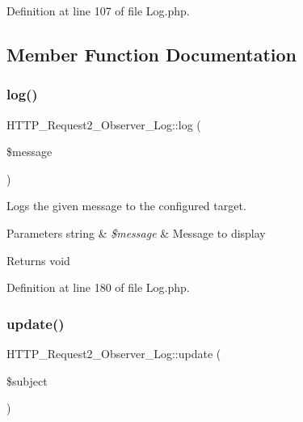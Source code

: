 Definition at line 107 of file Log.\+php.



\subsection{Member Function Documentation}
\mbox{\label{classHTTP__Request2__Observer__Log_a253f36793403dd77277fb2e76d19c117}} 
\subsubsection{\texorpdfstring{log()}{log()}}
{\footnotesize\ttfamily H\+T\+T\+P\+\_\+\+Request2\+\_\+\+Observer\+\_\+\+Log\+::log (\begin{DoxyParamCaption}\item[{}]{\$message }\end{DoxyParamCaption})\hspace{0.3cm}{\ttfamily [protected]}}

Logs the given message to the configured target.


\begin{DoxyParams}[1]{Parameters}
string & {\em \$message} & Message to display\\
\hline
\end{DoxyParams}
\begin{DoxyReturn}{Returns}
void 
\end{DoxyReturn}


Definition at line 180 of file Log.\+php.

\mbox{\label{classHTTP__Request2__Observer__Log_a3afb07b1a609c2f3c12b9cd5fa267947}} 
\subsubsection{\texorpdfstring{update()}{update()}}
{\footnotesize\ttfamily H\+T\+T\+P\+\_\+\+Request2\+\_\+\+Observer\+\_\+\+Log\+::update (\begin{DoxyParamCaption}\item[{Spl\+Subject}]{\$subject }\end{DoxyParamCaption})}


